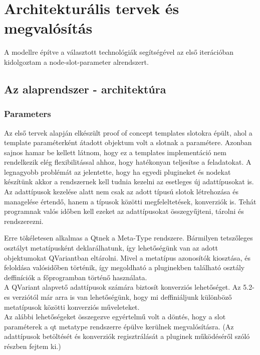 \documentclass[a4paper,12pt,oneside]{report}
\begin{document}
\section{Architekturális tervek és megvalósítás}
A modellre építve a választott technológiák segítségével az első iterációban kidolgoztam a node-slot-parameter alrendszert.
\subsection{Az alaprendszer - architektúra}
\subsubsection{Parameters}
Az első tervek alapján elkészült proof of concept templates slotokra épült, ahol a template paraméterként átadott objektum volt a slotnak a paramétere. Azonban sajnos hamar be kellett látnom, hogy ez a templates implementáció nem rendelkezik elég flexibilitással ahhoz, hogy hatékonyan teljesítse a feladatokat. A legnagyobb problémát az jelentette, hogy ha egyedi plugineket és nodekat készítünk akkor a rendszernek kell tudnia kezelni az esetleges új adattípusokat is. Az adattípusok kezelése alatt nem csak az adott típusú slotok létrehozása és managelése értendő, hanem a típusok közötti megfeleltetések, konverziók is. Tehát programnak valós időben kell ezeket az adattípusokat összegyűjteni, tárolni és rendszerezni.

Erre tökéletesen alkalmas a Qtnek a Meta-Type rendszere. Bármilyen tetszőleges osztályt metatípusként deklarálhatunk, így lehetőségünk van az adott objektumokat QVariantban eltárolni. \cite{website:qt_metatype_1} Mivel a metatípus azonosítók kiosztása, és feloldása valósidőben történik, így megoldható a pluginekben található osztály deffiníciók a főprogramban történő használata.\\
A QVariant alapvető adattípusok számára biztosít konverziós lehetőséget. Az 5.2-es verziótól már arra is van lehetőségünk, hogy mi deffiniáljunk különböző metatípusok közötti konverziós műveleteket. \\ Az alábbi lehetőségeket összegezve egyértelmű volt a döntés, hogy a slot paraméterek a qt metatype rendszerre épülve kerülnek megvalósításra. (Az adattípusok betöltését és konverziók regisztrálását a pluginek működéséről szóló részben fejtem ki.)
\end{document}
